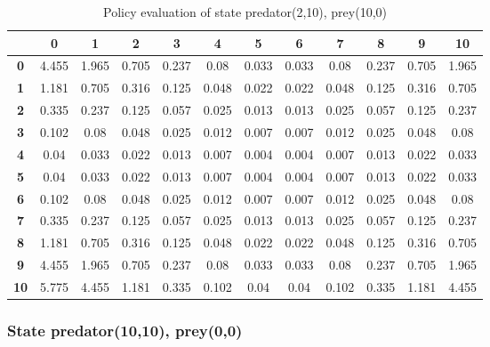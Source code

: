 \documentclass[11pt]{article}
\begin{document}
\begin{center}
\begin{table*}[ht]
{\small
\hfill{}
\begin{tabular}{c|c|c|c|c|c|c|c|c|c|c|c}
\textbf{} & \textbf{0} & \textbf{1} & \textbf{2} & \textbf{3} & \textbf{4} & \textbf{5} & \textbf{6} & \textbf{7} & \textbf{8} & \textbf{9} & \textbf{10}\\
	\hline
\textbf{0}& 4.455	& 1.965	& 0.705	& 0.237	& 0.08	& 0.033	& 0.033	& 0.08	& 0.237	& 0.705	& 1.965	\\
\textbf{1}& 1.181	& 0.705	& 0.316	& 0.125	& 0.048	& 0.022	& 0.022	& 0.048	& 0.125	& 0.316	& 0.705	\\
\textbf{2}& 0.335	& 0.237	& 0.125	& 0.057	& 0.025	& 0.013	& 0.013	& 0.025	& 0.057	& 0.125	& 0.237	\\
\textbf{3}& 0.102	& 0.08	& 0.048	& 0.025	& 0.012	& 0.007	& 0.007	& 0.012	& 0.025	& 0.048	& 0.08	\\
\textbf{4}& 0.04	& 0.033	& 0.022	& 0.013	& 0.007	& 0.004	& 0.004	& 0.007	& 0.013	& 0.022	& 0.033	\\
\textbf{5}& 0.04	& 0.033	& 0.022	& 0.013	& 0.007	& 0.004	& 0.004	& 0.007	& 0.013	& 0.022	& 0.033	\\
\textbf{6}& 0.102	& 0.08	& 0.048	& 0.025	& 0.012	& 0.007	& 0.007	& 0.012	& 0.025	& 0.048	& 0.08	\\
\textbf{7}& 0.335	& 0.237	& 0.125	& 0.057	& 0.025	& 0.013	& 0.013	& 0.025	& 0.057	& 0.125	& 0.237	\\
\textbf{8}& 1.181	& 0.705	& 0.316	& 0.125	& 0.048	& 0.022	& 0.022	& 0.048	& 0.125	& 0.316	& 0.705	\\
\textbf{9}& 4.455	& 1.965	& 0.705	& 0.237	& 0.08	& 0.033	& 0.033	& 0.08	& 0.237	& 0.705	& 1.965	\\
\textbf{10}& 5.775	& 4.455	& 1.181	& 0.335	& 0.102	& 0.04	& 0.04	& 0.102	& 0.335	& 1.181	& 4.455	\\
\end{tabular}}
\hfill{}
\caption{Policy evaluation of state predator(2,10), prey(10,0)}
\label{state3}
\end{table*}
\end{center}	
	
	
\subsubsection{State predator(10,10), prey(0,0)}
\end{document}
